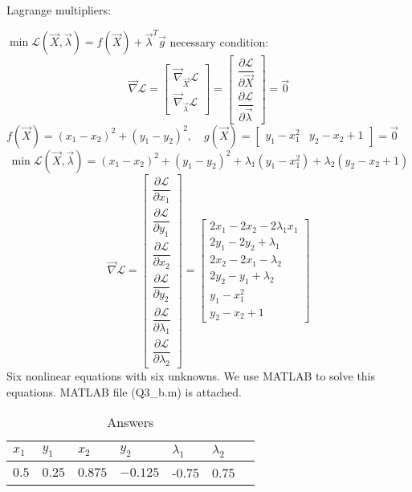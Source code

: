 Lagrange multipliers:


$\min \mathcal{L}(\vec{X}, \vec{\lambda}) = f(\vec{X}) +\vec{\lambda}^T \vec{g}$
necessary condition:
$$\vec{\nabla} \mathcal{L}  =  \begin{bmatrix}
	 \vec{\nabla}_{\vec{X}} \mathcal{L} \\[6pt]
	 \vec{\nabla}_{\vec{\lambda}} \mathcal{L}
\end{bmatrix} = \begin{bmatrix}
\dfrac{\partial \mathcal{L}}{\partial \vec{X}} \\[10pt]
\dfrac{\partial \mathcal{L}}{\partial \vec{\lambda}}
\end{bmatrix} = \vec{0}$$
$f(\vec{X}) = (x_1- x_2)^2 + (y_1 - y_2)^2, \quad  g(\vec{X}) = \begin{bmatrix}
y_1-x_1^2 &
y_2-x_2+1
\end{bmatrix} = \vec{0}$
$$\min \mathcal{L}(\vec{X}, \vec{\lambda}) = (x_1- x_2)^2 + (y_1 - y_2)^2 + \lambda_1(y_1-x_1^2) + \lambda_2(y_2-x_2+1)$$
$$\vec{\nabla} \mathcal{L} = \begin{bmatrix}
	\dfrac{\partial \mathcal{L}}{\partial x_1} \\[10pt]
	\dfrac{\partial \mathcal{L}}{\partial y_1} \\[10pt]
	\dfrac{\partial \mathcal{L}}{\partial x_2} \\[10pt]
	\dfrac{\partial \mathcal{L}}{\partial y_2} \\[10pt]
	\dfrac{\partial \mathcal{L}}{\partial \lambda_1} \\[10pt]
	\dfrac{\partial \mathcal{L}}{\partial \lambda_2} 
\end{bmatrix}  =  \begin{bmatrix}
2x_1 - 2x_2 - 2\lambda_1x_1 \\
2y_1 - 2y_2 + \lambda_1 \\
2x_2 - 2x_1 - \lambda_2 \\
2y_2 - y_1 + \lambda_2 \\
y_1-x_1^2\\
y_2-x_2+1
\end{bmatrix} $$
Six nonlinear equations with six unknowns. We use MATLAB to solve this equations. MATLAB file (Q3\_b.m) is attached.
\begin{table}[H]
	\caption {Answers} \label{ans} 
	\begin{center}
		\begin{tabular}{| l | l | l | l | l | l | l |}
			\hline
			$x_1$ & $y_1$ & $x_2$ & $y_2$ &  $\lambda_1$&  $\lambda_2$ \TBstrut \\
			\hline
			$0.5$ & $0.25$ & $0.875$ & $-0.125$ & -0.75& 0.75 \Tstrut\\
			\hline
		\end{tabular}
	\end{center}
\end{table}
